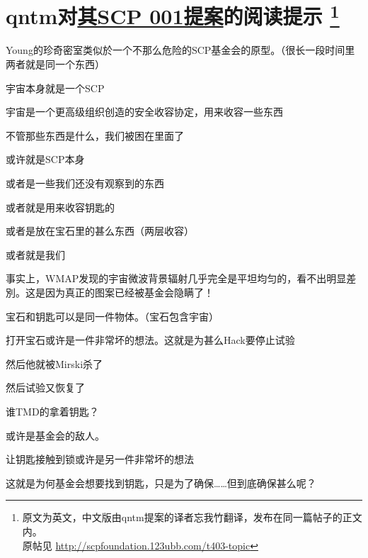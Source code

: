 \chapter[qntm对其SCP 001提案的阅读提示]{
qntm对\hyperref[chap:SCP.001.the.lock]{其SCP 001提案}的阅读提示
	\protect\footnote{
		原文为英文，中文版由qntm提案的译者忘我竹翻译，发布在同一篇帖子的正文内。 \\
		原帖见 \url{http://scpfoundation.123ubb.com/t403-topic}
	}
}

\label{chap:qntm.tips}

Young的珍奇密室类似於一个不那么危险的SCP基金会的原型。（很长一段时间里两者就是同一个东西）

宇宙本身就是一个SCP

宇宙是一个更高级组织创造的安全收容协定，用来收容一些东西

不管那些东西是什么，我们被困在里面了

或许就是SCP本身

或者是一些我们还没有观察到的东西

或者就是用来收容钥匙的

或者是放在宝石里的甚么东西（两层收容）

或者就是我们

事实上，WMAP发现的宇宙微波背景辐射几乎完全是平坦均匀的，看不出明显差別。这是因为真正的图案已经被基金会隐瞒了！

宝石和钥匙可以是同一件物体。（宝石包含宇宙）

打开宝石或许是一件非常坏的想法。这就是为甚么Hack要停止试验

然后他就被Mirski杀了

然后试验又恢复了

谁TMD的拿着钥匙？

或许是基金会的敌人。

让钥匙接触到锁或许是另一件非常坏的想法

这就是为何基金会想要找到钥匙，只是为了确保……但到底确保甚么呢？

